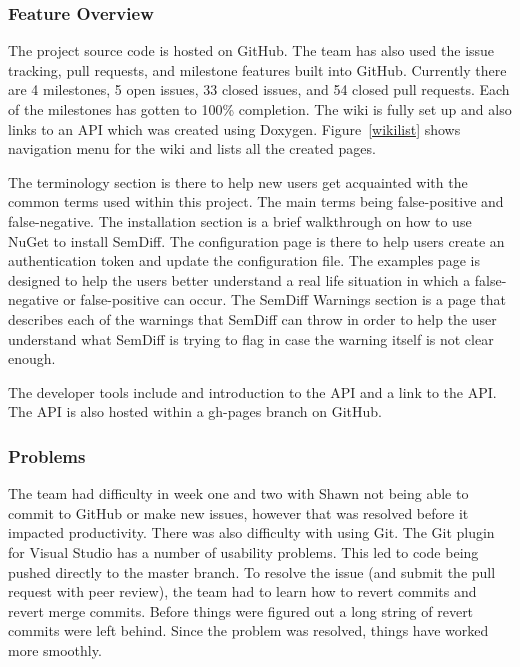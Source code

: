 \documentclass[draftclsnofoot,onecolumn]{IEEEtran}
\begin{document}
\subsubsection{Feature Overview}
The project source code is hosted on GitHub. The team has also used the issue tracking, pull requests, and milestone features built into GitHub. Currently there are 4 milestones, 5 open issues, 33 closed issues, and 54 closed pull requests. Each of the milestones has gotten to 100\% completion. The wiki is fully set up and also links to an API which was created using Doxygen. Figure~\ref{wikilist} shows navigation menu for the wiki and lists all the created pages.

The terminology section is there to help new users get acquainted with the common terms used within this project. The main terms being false-positive and false-negative. The installation section is a brief walkthrough on how to use NuGet to install SemDiff. The configuration page is there to help users create an authentication token and update the configuration file. The examples page is designed to help the users better understand a real life situation in which a false-negative or false-positive can occur. The SemDiff Warnings section is a page that describes each of the warnings that SemDiff can throw in order to help the user understand what SemDiff is trying to flag in case the warning itself is not clear enough.

The developer tools include and introduction to the API and a link to the API. The API is also hosted within a gh-pages branch on GitHub. 



\subsubsection{Problems}

The team had difficulty in week one and two with Shawn not being able to commit to GitHub or make new issues, however that was resolved before it impacted productivity. There was also difficulty with using Git. The Git plugin for Visual Studio has a number of usability problems. This led to code being pushed directly to the master branch. To resolve the issue (and submit the pull request with peer review), the team had to learn how to revert commits and revert merge commits. Before things were figured out a long string of revert commits were left behind. Since the problem was resolved, things have worked more smoothly.

\end{document}
